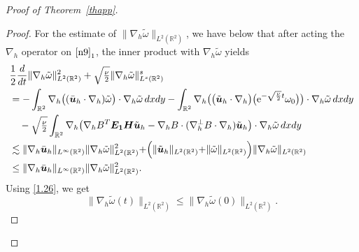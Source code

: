 \documentclass[pdflatex,sn-mathphys-num]{sn-jnl}%
\theoremstyle{thmstyleone}%
\theoremstyle{thmstyletwo}%
\theoremstyle{thmstylethree}%
\theoremstyle{thmstyletwo}
\begin{document}
\begin{proof}[Proof of Theorem~{\upshape\ref{thapp}}]
\begin{proof}
	For the estimate of $\lVert\nabla_{ h}\tilde{\omega}\rVert_{L^2(\mathbb{R}^2)}$, we have below that after acting the $\nabla_{ h}$ operator on $\eqref{n9}_1$, the inner product with $\nabla_{h}\tilde{\omega}$ yields
	\begin{align}\label{n20}
		&	\frac12\frac{d}{dt}\lVert\nabla_{h}\tilde{\omega}\rVert_{L^2(\mathbb{R}^2)}^2+\sqrt{\tfrac{\nu}{2}}\lVert\nabla_{h}
		\tilde{\omega}
		\rVert_{L^s(\mathbb{R}^2)}^s
		\notag\\\notag
		&=
		-\int_{\mathbb{R}^2}
		\nabla_{ h}\big(
		(\bar {\boldsymbol u}_h \cdot \nabla_h) \tilde{\omega}
		\big)\cdot
		\nabla_{ h}\tilde{\omega}
		\,dx{d}y
		-\int_{\mathbb{R}^2}
		\nabla_{ h}\big(
		\big(\tilde{\boldsymbol{u}}_h\cdot\nabla_{ h}\big)\big(\mathrm{e}^{-\sqrt{\frac\nu2}t}{\omega}_0\big)
		\big)\cdot
		\nabla_{ h}\tilde{\omega}
		\,dx{d}y\notag\\
		&\quad-\sqrt{\tfrac{\nu}{2}}\int_{\mathbb{R}^2}
		\nabla_{ h}\big(
		\nabla_hB^T\boldsymbol{E_1} \boldsymbol{H}
		\tilde{\boldsymbol{u}}_h
		-\nabla_hB\cdot(\nabla_h^\bot B\cdot\nabla_h)\tilde{\boldsymbol{u}}_h
		\big)\cdot
		\nabla_{ h}\tilde{\omega}
		\,dx{d}y
		\notag\\
		&\lesssim
		\lVert
		\nabla_{ h}\bar{\boldsymbol{u}}_h
		\lVert_{L^\infty(\mathbb{R}^2)}
		\lVert
		\nabla_{ h}\tilde{\omega}
		\lVert^{2}_{L^2(\mathbb{R}^2)}
		+
		\Big(\lVert
		\tilde{\boldsymbol{u}}_h
		\lVert_{L^2(\mathbb{R}^2)}
		+\lVert
		\tilde{\omega}
		\lVert_{L^2(\mathbb{R}^2)}\Big)
		\lVert
		\nabla_{h}\tilde{\omega}
		\lVert_{L^2(\mathbb{R}^2)}\notag\\
		&\leq\lVert
		\nabla_{ h}\bar{\boldsymbol{u}}_h
		\lVert_{L^\infty(\mathbb{R}^2)}
		\lVert
		\nabla_{ h}\tilde{\omega}
		\lVert^{2}_{L^2(\mathbb{R}^2)}.
	\end{align}
	Using \eqref{1.26}, we get
	\begin{equation}\label{n21}
		\lVert\nabla_{ h}\tilde{\omega}(t)\rVert_{L^2(\mathbb{R}^2)}\leq
		\lVert\nabla_{ h}\tilde{\omega}(0)\rVert_{L^2(\mathbb{R}^2)}
		.
	\end{equation}
\end{proof}







\end{proof}
\end{document}
